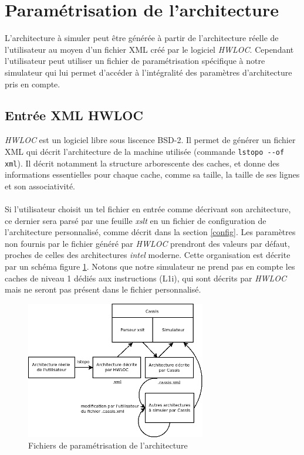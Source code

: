 \section{Paramétrisation de l'architecture}

L'architecture à simuler peut être générée à partir de l'architecture réelle de l'utilisateur au moyen d'un fichier XML créé par le logiciel \emph{HWLOC}. Cependant l'utilisateur peut utiliser un fichier de paramétrisation spécifique à notre simulateur qui lui permet d'accéder à l'intégralité des paramètres d'architecture pris en compte.

\subsection{Entrée XML HWLOC}

\emph{HWLOC} est un logiciel libre sous liscence BSD-2. Il permet de générer un fichier XML qui décrit l'architecture de la machine utilisée (commande \verb?lstopo --of xml?). Il décrit notamment la structure arborescente des caches, et donne des informations essentielles pour chaque cache, comme sa taille, la taille de ses lignes et son associativité. 

\paragraph{}
Si l'utilisateur choisit un tel fichier en entrée comme décrivant son architecture, ce dernier sera parsé par une feuille \textit{xslt} en un fichier de configuration de l'architecture personnalisé, comme décrit dans la section \ref{config}. Les paramètres non fournis par le fichier généré par \emph{HWLOC} prendront des valeurs par défaut, proches de celles des architectures \emph{intel} moderne. Cette organisation est décrite par un schéma figure \ref{img:archi}. Notons que notre simulateur ne prend pas en compte les caches de niveau 1 dédiés aux instructions (L1i), qui sont décrits par \emph{HWLOC} mais ne seront pas présent dans le fichier personnalisé.

\begin{figure}[!h]
\begin{center}
   \includegraphics[width=0.7\textwidth]{images/schema_archi.png}
   \caption{\label{img:archi} Fichiers de paramétrisation de l'architecture}
\end{center}
\end{figure}

